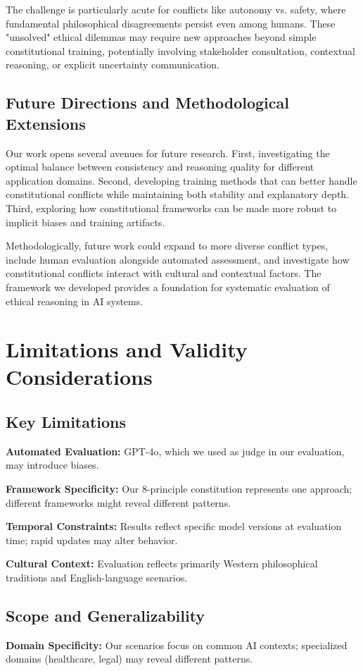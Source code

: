 \documentclass[10pt,a4paper]{article}
\begin{document}
The challenge is particularly acute for conflicts like autonomy vs. safety, where fundamental philosophical disagreements persist even among humans. These "unsolved" ethical dilemmas may require new approaches beyond simple constitutional training, potentially involving stakeholder consultation, contextual reasoning, or explicit uncertainty communication.

\subsection{Future Directions and Methodological Extensions}
Our work opens several avenues for future research. First, investigating the optimal balance between consistency and reasoning quality for different application domains. Second, developing training methods that can better handle constitutional conflicts while maintaining both stability and explanatory depth. Third, exploring how constitutional frameworks can be made more robust to implicit biases and training artifacts.

Methodologically, future work could expand to more diverse conflict types, include human evaluation alongside automated assessment, and investigate how constitutional conflicts interact with cultural and contextual factors. The framework we developed provides a foundation for systematic evaluation of ethical reasoning in AI systems.

\section{Limitations and Validity Considerations}

\subsection{Key Limitations}
\textbf{Automated Evaluation:} GPT-4o, which we used as judge in our evaluation, may introduce biases.

\textbf{Framework Specificity:} Our 8-principle constitution represents one approach; different frameworks might reveal different patterns.

\textbf{Temporal Constraints:} Results reflect specific model versions at evaluation time; rapid updates may alter behavior.

\textbf{Cultural Context:} Evaluation reflects primarily Western philosophical traditions and English-language scenarios.

\subsection{Scope and Generalizability}
\textbf{Domain Specificity:} Our scenarios focus on common AI contexts; specialized domains (healthcare, legal) may reveal different patterns.
\end{document}
